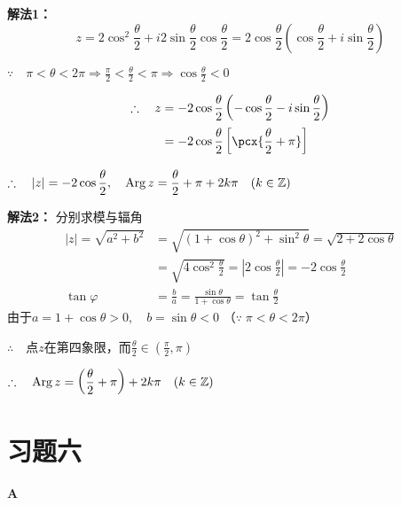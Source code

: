 \begin{solution}
\textbf{解法1：}
\[    z=2\cos^{2}\frac{\theta}{2}+i2\sin\frac{\theta}{2}\cos\frac{\theta}{2}
   =2\cos\frac{\theta}{2}\left(\cos\frac{\theta}{2}+i\sin\frac{\theta}{2}\right)
 \]

$\because\quad \pi<\theta<2\pi \Rightarrow \frac{\pi}{2}<\frac{\theta}{2}<\pi\Rightarrow \cos\frac{\theta}{2}<0$

\[\begin{split}
    \therefore\quad z&=-2\cos\frac{\theta}{2}\left(-\cos\frac{\theta}{2}-i\sin\frac{\theta}{2}\right)\\
    &=-2\cos\frac{\theta}{2}\left[\pcx{\frac{\theta}{2}+\pi}\right]
\end{split}\]

$\therefore\quad |z|=-2\cos\dfrac{\theta}{2},\quad {\rm Arg\,}z=\dfrac{\theta}{2}+\pi+2k\pi\quad (k\in\mathbb{Z})$
    
\textbf{解法2：} 分别求模与辐角
\[\begin{split}
    |z|=\sqrt{a^2+b^2}&=\sqrt{(1+\cos\theta)^2+\sin^2\theta}=\sqrt{2+2\cos\theta}\\
    &=\sqrt{4\cos^2\frac{\theta}{2}}=\left|2\cos\frac{\theta}{2}\right|=-2\cos\frac{\theta}{2}\\
    \tan\varphi&=\frac{b}{a}=\frac{\sin\theta}{1+\cos\theta}=\tan\frac{\theta}{2}
\end{split}\]
由于$a=1+\cos\theta>0,\quad b=\sin\theta<0$  （$\because\; \pi<\theta<2\pi$）

$\therefore\quad $点$z$在第四象限，而$\frac{\theta}{2}\in\left(\frac{\pi}{2},\pi\right)$

$\therefore\quad {\rm Arg\, }z=\left(\dfrac{\theta}{2}+\pi\right)+2k\pi\quad (k\in\mathbb{Z})$
\end{solution}

\section*{习题六}
\begin{center}
    \bfseries A
\end{center}

